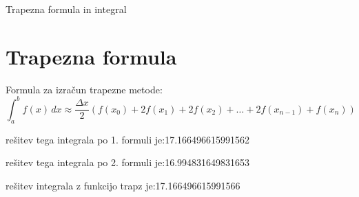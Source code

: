 \documentclass{beamer}
\begin{document}
\begin{frame}{Trapezna formula in integral}
\section{Trapezna formula}
\item Formula za izračun trapezne metode:
\[
\int_{a}^{b} f(x) \, dx \approx \frac{\Delta x}{2} \left( f(x_0) + 2f(x_1) + 2f(x_2) + \dots + 2f(x_{n-1}) + f(x_n) \right)
\]
\item rešitev tega integrala po 1. formuli je:17.166496615991562
\item rešitev tega integrala po 2. formuli je:16.994831649831653
\item rešitev integrala z funkcijo trapz je:17.166496615991566
\end{frame}
\end{document}
